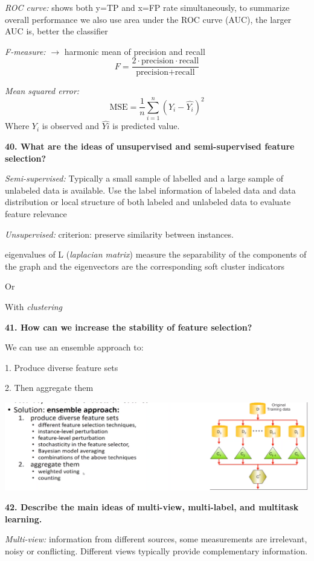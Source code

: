 \textit{ROC curve:} shows both y=TP and x=FP rate simultaneously, to
summarize overall performance we also use area under the ROC curve
(AUC), the larger AUC is, better the classifier

\textit{F-measure:} $\rightarrow$ harmonic mean of precision and
recall
\[ F = \frac{2 \cdot \text{precision} \cdot \text{recall} }{\text{precision} + \text{recall}} \]

\textit{Mean squared error:}
\[ \text{MSE} = \frac{1}{n} \sum_{i=1}^n (Y_i - \hat{Y_i})^2\]
Where $Y_i$ is observed and $\hat{Yi}$ is predicted value.


\textbf{40. What are the ideas of unsupervised and semi-supervised
feature selection?}

\textit{Semi-supervised:} Typically a small sample of labelled and a
large sample of unlabeled data is available. Use the label information
of labeled data and data distribution or local structure of both labeled
and unlabeled data to evaluate feature relevance

\textit{Unsupervised:} criterion: preserve similarity between
instances.

eigenvalues of L (\emph{laplacian matrix}) measure the separability of
the components of the graph and the eigenvectors are the corresponding
soft cluster indicators

Or

With \emph{clustering}

\textbf{41. How can we increase the stability of feature selection?}

We can use an ensemble approach to:

1. Produce diverse feature sets

2. Then aggregate them

\includegraphics[width=\columnwidth]{media/image36.png}

\textbf{42. Describe the main ideas of multi-view, multi-label, and
multitask learning.}

\textit{Multi-view:} information from different sources, some
measurements are irrelevant, noisy or conflicting. Different views
typically provide complementary information.

